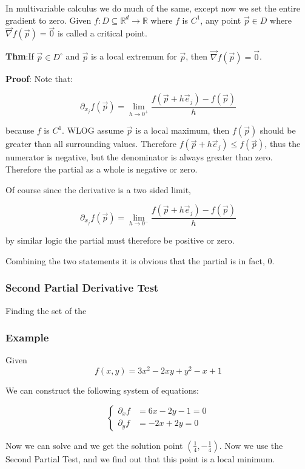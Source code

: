 \documentclass[11 pt, twoside]{article}
\newcommand{\gradient}{\vec{\nabla}}
\begin{document}
In multivariable calculus we do much of the same, except now we set the entire
gradient to zero. Given $f: D \subseteq \mathbb{R}^d \to \mathbb{R}$ where
$f$ is $C^1$, any point $\vec{p} \in D$ where $\gradient f(\vec{p}) = \vec{0}$
is called a critical point.

\textbf{Thm}:If $\vec{p} \in D^\circ$ and $\vec{p}$ is a local extremum for
$\vec{p}$, then $\gradient f(\vec{p}) = \vec{0}$.

\textbf{Proof}: Note that:

$$\partial_{x_j} f(\vec{p}) = \lim_{h \to 0^+} \frac{f(\vec{p} +
h\vec{e}_j) - f(\vec{p})}{h}$$

because $f$ is $C^1$. WLOG assume $\vec{p}$ is a local maximum, then
$f(\vec{p})$ should be greater than all surrounding values. Therefore $f(\vec{p}
+ h\vec{e}_j) \leq f(\vec{p})$, thus the numerator is negative, but the denominator
is always greater than zero. Therefore the partial as a whole is negative or
zero.

Of course since the derivative is a two sided limit, 

$$\partial_{x_j} f(\vec{p}) = \lim_{h \to 0^-} \frac{f(\vec{p} +
h\vec{e}_j) - f(\vec{p})}{h}$$

by similar logic the partial must therefore be positive or zero.

Combining the two statements it is obvious that the partial is in fact, 0.

\subsubsection{Second Partial Derivative Test}

Finding the set of the 

\subsubsection{Example}
Given 
$$f(x, y) = 3x^2 - 2xy + y^2 - x + 1$$

We can construct the following system of equations:

\[
\begin{cases}
\partial_x f &= 6x - 2y - 1 = 0\\
\partial_y f &= -2x + 2y = 0
\end{cases}
\]

Now we can solve and we get the solution point $(\frac{1}{4}, -\frac{1}{4})$.
Now we use the Second Partial Test, and we find out that this point is a local
minimum.
\end{document}
